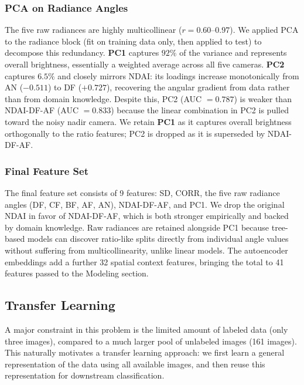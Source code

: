 \documentclass[10pt,letterpaper]{article}
\begin{document}
\subsubsection*{PCA on Radiance Angles}

The five raw radiances are highly multicollinear ($r = 0.60$--$0.97$). We applied PCA to the radiance block (fit on training data only, then applied to test) to decompose this redundancy. \textbf{PC1} captures $92\%$ of the variance and represents overall brightness, essentially a weighted average across all five cameras. \textbf{PC2} captures $6.5\%$ and closely mirrors NDAI: its loadings increase monotonically from AN ($-0.511$) to DF ($+0.727$), recovering the angular gradient from data rather than from domain knowledge. Despite this, PC2 (AUC $= 0.787$) is weaker than NDAI-DF-AF (AUC $= 0.833$) because the linear combination in PC2 is pulled toward the noisy nadir camera. We retain \textbf{PC1} as it captures overall brightness orthogonally to the ratio features; PC2 is dropped as it is superseded by NDAI-DF-AF.

\subsubsection*{Final Feature Set}

The final feature set consists of 9 features: SD, CORR, the five raw radiance angles (DF, CF, BF, AF, AN), NDAI-DF-AF, and PC1. We drop the original NDAI in favor of NDAI-DF-AF, which is both stronger empirically and backed by domain knowledge. Raw radiances are retained alongside PC1 because tree-based models can discover ratio-like splits directly from individual angle values without suffering from multicollinearity, unlike linear models. The autoencoder embeddings add a further 32 spatial context features, bringing the total to 41 features passed to the Modeling section. 

\subsection{Transfer Learning}

A major constraint in this problem is the limited amount of labeled data (only three images), compared to a much larger pool of unlabeled images (161 images). This naturally motivates a transfer learning approach: we first learn a general representation of the data using all available images, and then reuse this representation for downstream classification.
\end{document}
